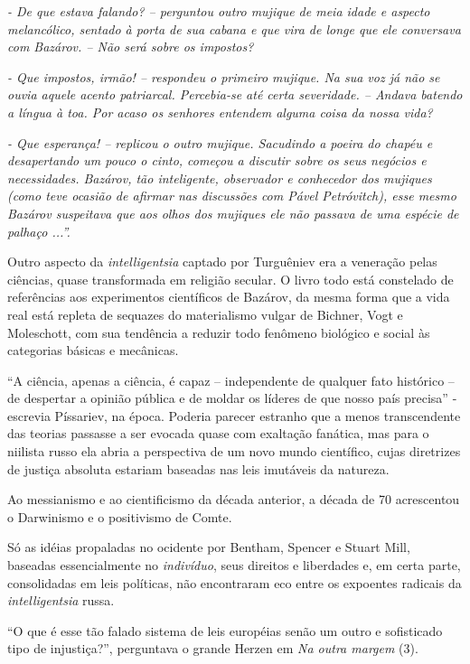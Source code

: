 \emph{- De que estava falando? -- perguntou outro mujique de meia idade
e aspecto melancólico, sentado à porta de sua cabana e que vira de longe
que ele conversava com Bazárov. -- Não será sobre os impostos?}

\emph{- Que impostos, irmão! -- respondeu o primeiro mujique. Na sua voz
já não se ouvia aquele acento patriarcal. Percebia-se até certa
severidade. -- Andava batendo a língua à toa. Por acaso os senhores
entendem alguma coisa da nossa vida?}

\emph{- Que esperança! -- replicou o outro mujique. Sacudindo a poeira
do chapéu e desapertando um pouco o cinto, começou a discutir sobre os
seus negócios e necessidades. Bazárov, tão inteligente, observador e
conhecedor dos mujiques (como teve ocasião de afirmar nas discussões com
Pável Petróvitch), esse mesmo Bazárov suspeitava que aos olhos dos
mujiques ele não passava de uma espécie de palhaço ...''.}

Outro aspecto da \emph{intelligentsia} captado por Turguêniev era a
veneração pelas ciências, quase transformada em religião secular. O
livro todo está constelado de referências aos experimentos científicos
de Bazárov, da mesma forma que a vida real está repleta de sequazes do
materialismo vulgar de Bichner, Vogt e Moleschott, com sua tendência a
reduzir todo fenômeno biológico e social às categorias básicas e
mecânicas.

``A ciência, apenas a ciência, é capaz -- independente de qualquer fato
histórico -- de despertar a opinião pública e de moldar os líderes de
que nosso país precisa'' - escrevia Píssariev, na época. Poderia parecer
estranho que a menos transcendente das teorias passasse a ser evocada
quase com exaltação fanática, mas para o niilista russo ela abria a
perspectiva de um novo mundo científico, cujas diretrizes de justiça
absoluta estariam baseadas nas leis imutáveis da natureza.

Ao messianismo e ao cientificismo da década anterior, a década de 70
acrescentou o Darwinismo e o positivismo de Comte.

Só as idéias propaladas no ocidente por Bentham, Spencer e Stuart Mill,
baseadas essencialmente no \emph{indivíduo}, seus direitos e liberdades
e, em certa parte, consolidadas em leis políticas, não encontraram eco
entre os expoentes radicais da \emph{intelligentsia} russa.

``O que é esse tão falado sistema de leis européias senão um outro e
sofisticado tipo de injustiça?'', perguntava o grande Herzen em \emph{Na
outra margem} (3).

